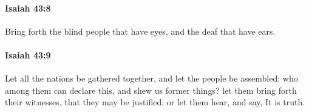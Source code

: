 		\paragraph{Isaiah 43:8} %
			\label{ISAIAH-43-8}

			Bring forth the blind people that have eyes, and the deaf that have ears.


		\paragraph{Isaiah 43:9} %
			\label{ISAIAH-43-9}

			Let all the nations be gathered together, and let the people be assembled: who among them can declare this, and shew us former things? let them bring forth their witnesses, that they may be justified: or let them hear, and say, It is truth.


